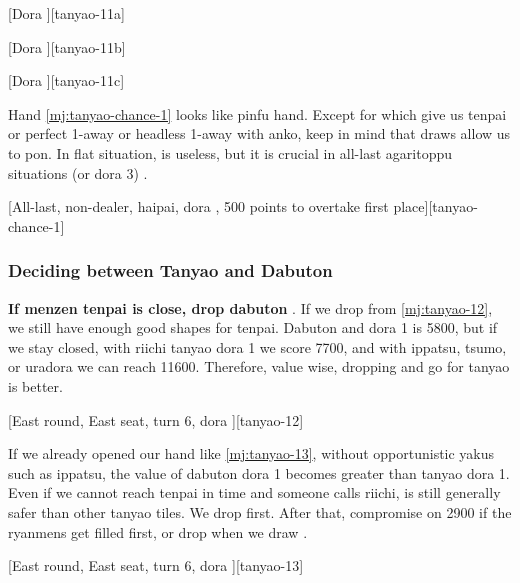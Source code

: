 \documentclass[12pt]{article}
\begin{document}
[Dora ][tanyao-11a]

[Dora ][tanyao-11b]

[Dora ][tanyao-11c]

Hand \ref{mj:tanyao-chance-1} looks like pinfu hand. Except for  which give us tenpai or perfect 1-away or headless 1-away with anko, keep in mind that  draws allow us to pon. In flat situation,  is useless, but it is crucial in all-last agaritoppu situations (or dora 3) \citep[][pp.~17--18]{kawamura-naki}.

[All-last, non-dealer, haipai, dora , 500 points to overtake first place][tanyao-chance-1]


\subsubsection*{Deciding between Tanyao and Dabuton}

\textbf{If menzen tenpai is close, drop dabuton }\citep[][pp.~138--139]{fkt}. If we drop  from \ref{mj:tanyao-12}, we still have enough good shapes for tenpai. Dabuton and dora 1 is 5800, but if we stay closed, with riichi tanyao dora 1 we score 7700, and with ippatsu, tsumo, or uradora we can reach 11600. Therefore, value wise, dropping  and go for tanyao is better.

[East round, East seat, turn 6, dora ][tanyao-12]

%
%

If we already opened our hand like \ref{mj:tanyao-13}, without opportunistic yakus such as ippatsu, the value of dabuton dora 1 becomes greater than tanyao dora 1. Even if we cannot reach tenpai in time and someone calls riichi,  is still generally safer than other tanyao tiles. We drop  first. After that, compromise on 2900 if the ryanmens get filled first, or drop  when we draw  \citep[][pp.~143--144, p.~218]{fkt}.

[East round, East seat, turn 6, dora ][tanyao-13]
\end{document}
